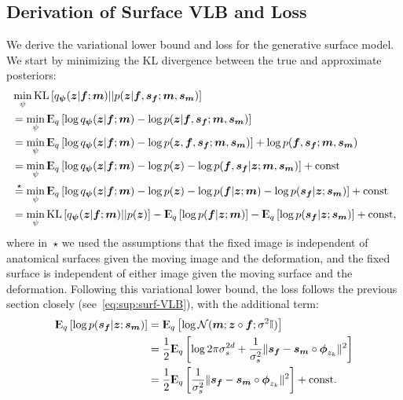 \documentclass{article}
\newcommand{\bs}{\boldsymbol{s}}
\newcommand{\bphi}{\boldsymbol{\phi}}
\newcommand{\bpsi}{\boldsymbol{\psi}}
\newcommand{\KL}{\text{KL}}
\newcommand{\bz}{\boldsymbol{z}}
\newcommand{\bmoving}{\boldsymbol{m}}
\newcommand{\bfixed}{\boldsymbol{f}}
\newcommand{\Expect}{{\rm I\kern-.3em E}}
\begin{document}
\subsection*{Derivation of Surface VLB and Loss}
\label{sec:sup:surf-derivation}

We derive the variational lower bound and loss for the generative surface model. We start by minimizing the KL divergence between the true and approximate posteriors:
\begin{align}
&\min_{\psi} \KL \left[q_{\bpsi}(\bz|\bfixed ; \bmoving) || p(\bz|\bfixed, \bs_{\bfixed}; \bmoving, \bs_{\bmoving}) \right] \nonumber \\
&= \min_{\psi} \Expect_{q} \left[ \log q_{\bpsi}(\bz|\bfixed ; \bmoving) - \log p(\bz|\bfixed, \bs_{\bfixed}; \bmoving, \bs_{\bmoving}) \right] \nonumber \\
&= \min_{\psi} \Expect_{q} \left[ \log q_{\bpsi}(\bz|\bfixed ; \bmoving) - \log p(\bz, \bfixed, \bs_{\bfixed}; \bmoving, \bs_{\bmoving}) \right] + \log p(\bfixed, \bs_{\bfixed}; \bmoving, \bs_{\bmoving}) \nonumber \\
&= \min_{\psi} \Expect_{q} \left[ \log q_{\bpsi}(\bz|\bfixed ; \bmoving) - \log p(\bz) - \log p(\bfixed, \bs_{\bfixed} | \bz ; \bmoving, \bs_{\bmoving}) \right] + \text{const} \nonumber \\
&\stackrel{\star}{=} \min_{\psi} \Expect_{q} \left[ \log q_{\bpsi}(\bz|\bfixed ; \bmoving) - \log p(\bz) - \log p(\bfixed | \bz; \bmoving) - \log p(\bs_{\bfixed} | \bz ; \bs_{\bmoving}) \right] + \text{const} \nonumber \\
&= \min_{\psi} \KL \left[  q_{\bpsi}(\bz|\bfixed; \bmoving) ||  p(\bz)  \right] - \Expect_{q} \left[ \log p(\bfixed | \bz ; \bmoving) \right] -  \Expect_{q} \left[ \log p(\bs_{\bfixed} | \bz ; \bs_{\bmoving}) \right] + \text{const},
\label{eq:sup:surf-VLB}
\end{align}
where in~$\star$ we used the assumptions that the fixed image is independent of anatomical surfaces given the moving image and the deformation, and the fixed surface is independent of either image given the moving surface and the deformation. Following this variational lower bound, the loss follows the previous section closely (see~\eqref{eq:sup:surf-VLB}), with the additional term:
\begin{align}
\Expect_{q} \left[ \log p(\bs_{\bfixed} | \bz ; \bs_{\bmoving}) \right] &= \Expect_{q} \left[ \log \mathcal{N}(\bmoving ; \bz \circ \bfixed; \sigma^2 \mathbb{I}) \right] \nonumber \\
&= \frac{1}{2} \Expect_{q} \left[\log 2\pi \sigma_s^{2d} + \frac{1}{\sigma_s^2} \|\bs_{\bfixed} - \bs_{\bmoving} \circ \bphi_{z_k}\|^2 \right] \nonumber \\
&= \frac{1}{2} \Expect_{q} \left[\frac{1}{\sigma_s^2} \|\bs_{\bfixed} - \bs_{\bmoving} \circ \bphi_{z_k}\|^2 \right] + \text{const.}
\end{align}
\end{document}

